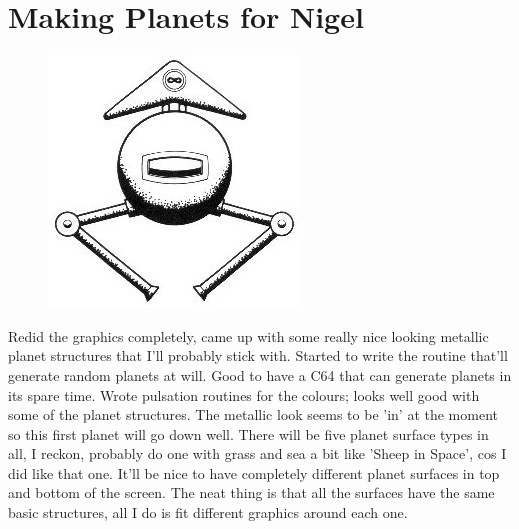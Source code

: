 \chapter{Making Planets for Nigel} 
\label{sec:planets}

\begin{definition}
\setlength{\intextsep}{0pt}%
\setlength{\columnsep}{3pt}%
\begin{figure}
\includegraphics[width=\linewidth]{src/callout/ia.jpg} 
\end{figure}
\small
Redid the graphics completely, came up with some really
nice looking metallic planet structures that I'll probably stick with. Started
to write the  routine that'll generate random planets at will. Good to
have a C64 that can generate planets in its spare time. Wrote pulsation
routines for the colours; looks well good with some of the planet structures.
The metallic look seems to be 'in' at the moment so this first planet will go
down well. There will be five planet surface types in all, I reckon, probably
do one with grass and sea a bit like 'Sheep in Space', cos I did like that one.
It'll be nice to have completely different planet surfaces in top and bottom of
the screen. The neat thing is that all the surfaces have the same basic
structures, all I do is fit different graphics around each one. 
\end{definition}

